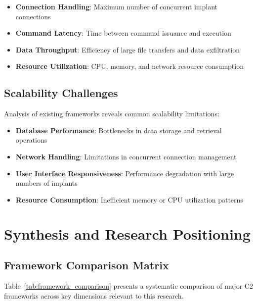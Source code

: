 \begin{itemize}
\item \textbf{Connection Handling}: Maximum number of concurrent implant connections
\item \textbf{Command Latency}: Time between command issuance and execution
\item \textbf{Data Throughput}: Efficiency of large file transfers and data exfiltration
\item \textbf{Resource Utilization}: CPU, memory, and network resource consumption
\end{itemize}

\subsection{Scalability Challenges}
\label{subsec:scalability_challenges}

Analysis of existing frameworks reveals common scalability limitations:

\begin{itemize}
\item \textbf{Database Performance}: Bottlenecks in data storage and retrieval operations
\item \textbf{Network Handling}: Limitations in concurrent connection management
\item \textbf{User Interface Responsiveness}: Performance degradation with large numbers of implants
\item \textbf{Resource Consumption}: Inefficient memory or CPU utilization patterns
\end{itemize}

\section{Synthesis and Research Positioning}
\label{sec:synthesis}

\subsection{Framework Comparison Matrix}
\label{subsec:comparison_matrix}

Table~\ref{tab:framework_comparison} presents a systematic comparison of major C2 frameworks across key dimensions relevant to this research.

